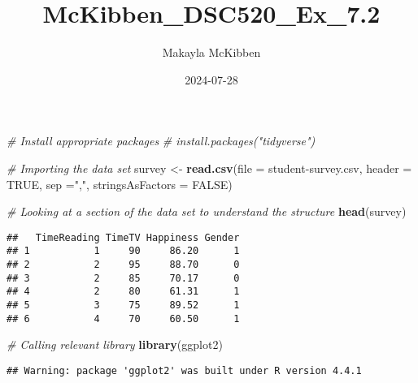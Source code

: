 \documentclass[
]{article}
\title{McKibben\_DSC520\_Ex\_7.2}
\author{Makayla McKibben}
\date{2024-07-28}
\newenvironment{Shaded}{\begin{snugshade}}{\end{snugshade}}
\newcommand{\AttributeTok}[1]{\textcolor[rgb]{0.13,0.29,0.53}{#1}}
\newcommand{\CommentTok}[1]{\textcolor[rgb]{0.56,0.35,0.01}{\textit{#1}}}
\newcommand{\ConstantTok}[1]{\textcolor[rgb]{0.56,0.35,0.01}{#1}}
\newcommand{\FunctionTok}[1]{\textcolor[rgb]{0.13,0.29,0.53}{\textbf{#1}}}
\newcommand{\NormalTok}[1]{#1}
\newcommand{\OtherTok}[1]{\textcolor[rgb]{0.56,0.35,0.01}{#1}}
\newcommand{\StringTok}[1]{\textcolor[rgb]{0.31,0.60,0.02}{#1}}
\begin{document}
\maketitle

\begin{Shaded}
\begin{Highlighting}[]
\CommentTok{\# Install appropriate packages}
\CommentTok{\# install.packages("tidyverse")}

\CommentTok{\# Importing the data set}
\NormalTok{survey }\OtherTok{\textless{}{-}} \FunctionTok{read.csv}\NormalTok{(}\AttributeTok{file =} \StringTok{\textquotesingle{}student{-}survey.csv\textquotesingle{}}\NormalTok{, }\AttributeTok{header =} \ConstantTok{TRUE}\NormalTok{, }\AttributeTok{sep =}\StringTok{","}\NormalTok{, }\AttributeTok{stringsAsFactors =} \ConstantTok{FALSE}\NormalTok{)}

\CommentTok{\# Looking at a section of the data set to understand the structure}
\FunctionTok{head}\NormalTok{(survey)}
\end{Highlighting}
\end{Shaded}

\begin{verbatim}
##   TimeReading TimeTV Happiness Gender
## 1           1     90     86.20      1
## 2           2     95     88.70      0
## 3           2     85     70.17      0
## 4           2     80     61.31      1
## 5           3     75     89.52      1
## 6           4     70     60.50      1
\end{verbatim}

\begin{Shaded}
\begin{Highlighting}[]
\CommentTok{\# Calling relevant library}
\FunctionTok{library}\NormalTok{(ggplot2)}
\end{Highlighting}
\end{Shaded}

\begin{verbatim}
## Warning: package 'ggplot2' was built under R version 4.4.1
\end{verbatim}
\end{document}
